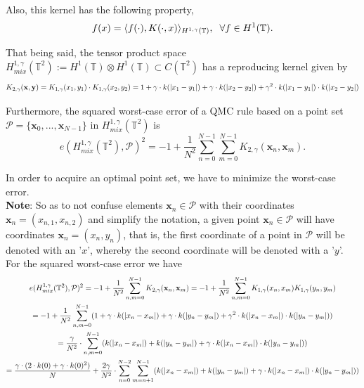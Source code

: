 Also, this kernel has the following property,
\begin{equation*}
    f(x) = \langle f(\cdot),K(\cdot,x) \rangle_{H^{1,\gamma}(\mathbb{T})}, \hspace{2mm} \forall f\in H^1(\mathbb{T}).
\end{equation*}

That being said, the tensor product space $H_{mix}^{1,\gamma}(\mathbb{T}^2) := H^1(\mathbb{T})\otimes H^1(\mathbb{T}) \subset C(\mathbb{T}^2)$ has a reproducing kernel given by
\begin{equation*}
    K_{2,\gamma}(\textbf{x},\textbf{y}) = K_{1,\gamma}(x_1,y_1) \cdot K_{1,\gamma}(x_2,y_2) = 1 + \gamma \cdot k(\lvert x_1-y_1\rvert) + \gamma \cdot k(\lvert x_2-y_2\rvert) + \gamma^2 \cdot k(\lvert x_1-y_1\rvert)\cdot k(\lvert x_2-y_2\rvert)
\end{equation*}

\vspace{2mm}
Furthermore, the squared worst-case error of a QMC rule based on a point set $\mathcal{P}=\{\textbf{x}_0,...,\textbf{x}_{N-1}\}$ in $H_{mix}^{1,\gamma}(\mathbb{T}^2)$ is
\begin{equation*}
    e(H_{mix}^{1,\gamma}(\mathbb{T}^2),\mathcal{P})^2 = -1 + \frac{1}{N^2} \sum_{n=0}^{N-1} \sum_{m=0}^{N-1} K_{2,\gamma}(\textbf{x}_n,\textbf{x}_m).
\end{equation*}

\vspace{2mm}
In order to acquire an optimal point set, we have to minimize the worst-case error.\\

\textbf{Note}: So as to not confuse elements $\textbf{x}_n \in \mathcal{P}$ with their coordinates $\textbf{x}_n = (x_{n,1},x_{n,2})$ and simplify the notation, a given point $\textbf{x}_n \in \mathcal{P}$ will have coordinates $\textbf{x}_n = (x_n,y_n)$, that is, the first coordinate of a point in $\mathcal{P}$ will be denoted with an '$x$', whereby the second coordinate will be denoted with a '$y$'.\\

For the squared worst-case error we have
\begin{multline*}
    e(H_{mix}^{1,\gamma}(\mathbb{T}^2),\mathcal{P})^2 = -1 + \frac{1}{N^2} \sum_{n,m=0}^{N-1} K_{2,\gamma}(\textbf{x}_n,\textbf{x}_m) = -1 + \frac{1}{N^2} \sum_{n,m=0}^{N-1} K_{1,\gamma}(x_n,x_m) K_{1,\gamma}(y_n,y_m) \\ 
    = -1 + \frac{1}{N^2} \sum_{n,m=0}^{N-1} (1 + \gamma \cdot k(\lvert x_n-x_m\rvert) + \gamma \cdot k(\lvert y_n-y_m\rvert) + \gamma^2 \cdot k(\lvert x_n-x_m\rvert)\cdot k(\lvert y_n-y_m\rvert)) \\
    =\frac{\gamma}{N^2} \cdot \sum_{n,m=0}^{N-1} (k(\lvert x_n-x_m\rvert) +  k(\lvert y_n-y_m\rvert) + \gamma \cdot k(\lvert x_n-x_m\rvert)\cdot k(\lvert y_n-y_m\rvert)) \\
    = \frac{\gamma \cdot (2\cdot k(0)+ \gamma \cdot k(0)^2)}{N} + \frac{2\gamma}{N^2} \cdot \sum_{n=0}^{N-2} \sum_{m=n+1}^{N-1} (k(\lvert x_n-x_m\rvert) +  k(\lvert y_n-y_m\rvert) + \gamma \cdot k(\lvert x_n-x_m\rvert)\cdot k(\lvert y_n-y_m\rvert))
\end{multline*}

